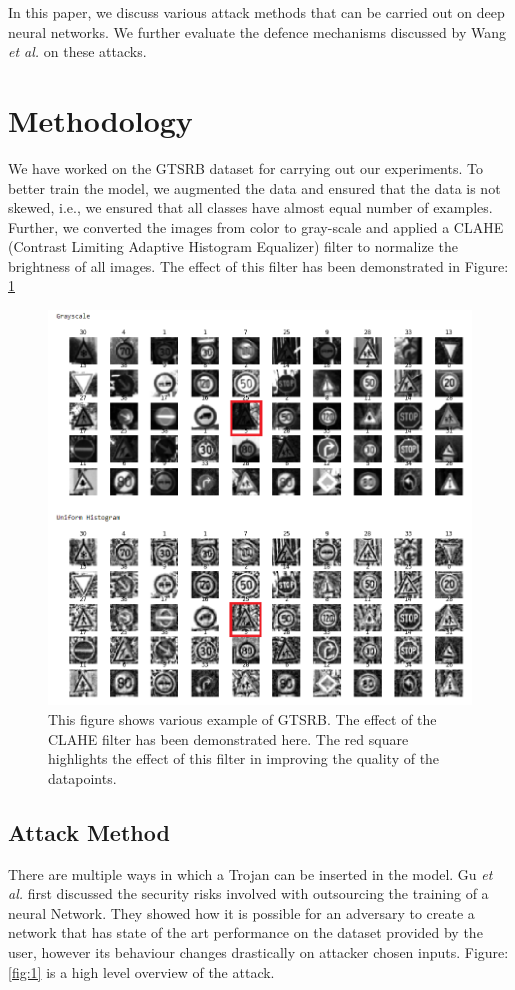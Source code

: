 \documentclass{article}
\newcommand{\etal}[0]{\emph{et al.}}
\newcommand{\fig}[1]{Figure: #1}
\begin{document}
In this paper, we discuss various attack methods that can be carried out on deep neural networks. We further evaluate the defence mechanisms discussed by Wang \etal \cite{wangNeuralCleanseIdentifying} on these attacks.

\section{Methodology}
We have worked on the GTSRB dataset \cite{stallkampManVsComputer2012} for carrying out our experiments. To better train the model, we augmented the data and ensured that the data is not skewed, i.e., we ensured that all classes have almost equal number of examples. Further, we converted the images from color to gray-scale and applied a CLAHE (Contrast Limiting Adaptive Histogram Equalizer) filter to normalize the brightness of all images. The effect of this filter has been demonstrated in \fig{\ref{fig:clahe}}
\begin{figure}
    \centering
    \includegraphics[width=\textwidth]{GrayscaleUniform.PNG}
    \caption{This figure shows various example of GTSRB. The effect of the CLAHE filter has been demonstrated here. The red square highlights the effect of this filter in improving the quality of the datapoints.}
    \label{fig:clahe}
\end{figure}
\subsection{Attack Method}
There are multiple ways in which a Trojan can be inserted in the model. Gu \etal \cite{2017arXiv170806733G} first discussed the security risks involved with outsourcing the training of a neural Network. They showed how it is possible for an adversary to create a network that has state of the art performance on the dataset provided by the user, however its behaviour changes drastically on attacker chosen inputs. \fig{\ref{fig:1}} is a high level overview of the attack.
\end{document}
